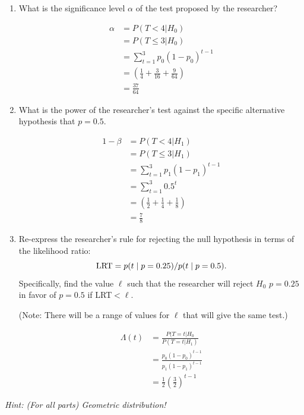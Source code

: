 \documentclass{article}
\newcommand{\1}{\mathbf{1}}
\begin{document}
\begin{enumerate}
    \item  What is the significance level $\alpha$ of the test proposed by the researcher?
   
    \begin{align*}
        \alpha &= P(T<4|H_0) \\
        &= P(T\leq 3 | H_0) \\
        &= \sum_{t=1}^3 p_0(1-p_0)^{t-1} \\
        &= \left(\frac{1}{4} + \frac{3}{16} + \frac{9}{64} \right) \\
        &= \frac{37}{64}
    \end{align*}
    
    \item What is the power of the researcher's test against the specific alternative hypothesis that $p=0.5$.
    
     \begin{align*}
        1- \beta &= P(T<4|H_1) \\
        &= P(T\leq 3 | H_1) \\
        &= \sum_{t=1}^3 p_1(1-p_1)^{t-1} \\
        &= \sum_{t=1}^3 0.5^t \\
        &= \left(\frac{1}{2} + \frac{1}{4} + \frac{1}{8} \right) \\
        &= \frac{7}{8}
    \end{align*}
    
    \item  Re-express the researcher's rule for rejecting the null hypothesis in terms of the likelihood ratio:
    $$ {\rm LRT} = p(t \mid p=0.25)/p(t \mid p=0.5). $$
    Specifically, find the value $\ell$ such that the researcher will reject $H_0$ $p=0.25$ in favor of $p=0.5$ if LRT$<\ell$.\par  {(Note: There will be a range of values for $\ell$ that will give the same test.)}
    
    \begin{align*}
        \Lambda (t) &= \frac{P(T=t|H_0}{P(T=t|H_1)} \\
        &= \frac{p_0(1-p_0)^{t-1}}{p_1(1-p_1)^{t-1}} \\
        &= \frac{1}{2}\left(\frac{3}{2}\right)^{t-1}
    \end{align*}
    
\end{enumerate}
{\it Hint: (For all parts) Geometric distribution!}
\end{document}

